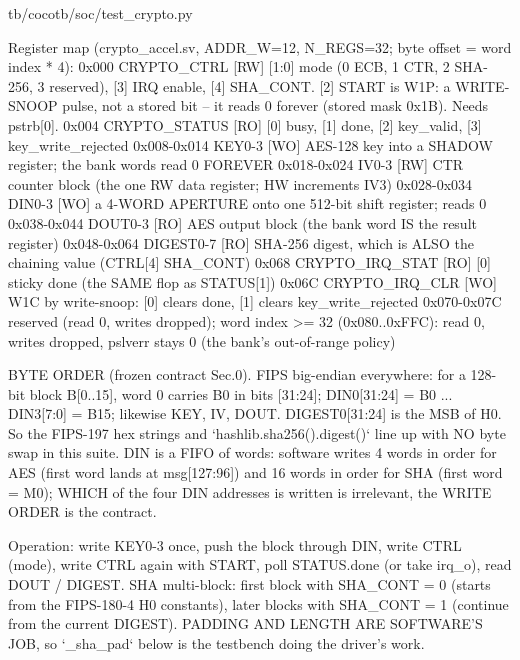 \begin{relocated}{tb/cocotb/soc/test_crypto.py}
\begin{textblock}
Register map (crypto_accel.sv, ADDR_W=12, N_REGS=32; byte offset = word index * 4):
0x000  CRYPTO_CTRL     [RW]  [1:0] mode (0 ECB, 1 CTR, 2 SHA-256, 3 reserved), [3] IRQ enable,
[4] SHA_CONT.  [2] START is W1P: a WRITE-SNOOP pulse, not a stored
bit -- it reads 0 forever (stored mask 0x1B).  Needs pstrb[0].
0x004  CRYPTO_STATUS   [RO]  [0] busy, [1] done, [2] key_valid, [3] key_write_rejected
0x008-0x014  KEY0-3    [WO]  AES-128 key into a SHADOW register; the bank words read 0 FOREVER
0x018-0x024  IV0-3     [RW]  CTR counter block (the one RW data register; HW increments IV3)
0x028-0x034  DIN0-3    [WO]  a 4-WORD APERTURE onto one 512-bit shift register; reads 0
0x038-0x044  DOUT0-3   [RO]  AES output block (the bank word IS the result register)
0x048-0x064  DIGEST0-7 [RO]  SHA-256 digest, which is ALSO the chaining value (CTRL[4] SHA_CONT)
0x068  CRYPTO_IRQ_STAT [RO]  [0] sticky done (the SAME flop as STATUS[1])
0x06C  CRYPTO_IRQ_CLR  [WO]  W1C by write-snoop: [0] clears done, [1] clears key_write_rejected
0x070-0x07C  reserved (read 0, writes dropped);  word index >= 32 (0x080..0xFFC): read 0,
writes dropped, pslverr stays 0 (the bank's out-of-range policy)

BYTE ORDER (frozen contract Sec.0).  FIPS big-endian everywhere: for a 128-bit block B[0..15],
word 0 carries B0 in bits [31:24]; DIN0[31:24] = B0 ... DIN3[7:0] = B15; likewise KEY, IV, DOUT.
DIGEST0[31:24] is the MSB of H0.  So the FIPS-197 hex strings and `hashlib.sha256().digest()`
line up with NO byte swap in this suite.  DIN is a FIFO of words: software writes 4 words in order
for AES (first word lands at msg[127:96]) and 16 words in order for SHA (first word = M0); WHICH of
the four DIN addresses is written is irrelevant, the WRITE ORDER is the contract.

Operation: write KEY0-3 once, push the block through DIN, write CTRL (mode), write CTRL again with
START, poll STATUS.done (or take irq_o), read DOUT / DIGEST.  SHA multi-block: first block with
SHA_CONT = 0 (starts from the FIPS-180-4 H0 constants), later blocks with SHA_CONT = 1 (continue
from the current DIGEST).  PADDING AND LENGTH ARE SOFTWARE'S JOB, so `_sha_pad` below is the
testbench doing the driver's work.


\end{textblock}
\end{relocated}
